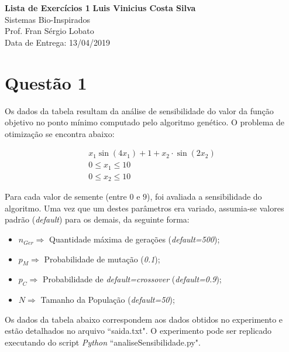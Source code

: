 \documentclass[a4paper, 11pt]{article}
\begin{document}
\noindent
\large\textbf{Lista de Exercícios 1} \hfill \textbf{Luis Vinicius Costa Silva} \\
\normalsize Sistemas Bio-Inspirados \\
Prof. Fran Sérgio Lobato \\
\hfill Data de Entrega: 13/04/2019

\section*{Questão 1}
Os dados da tabela resultam da análise de sensibilidade do valor da função objetivo no ponto mínimo computado pelo algoritmo genético. O problema de otimização se encontra abaixo:

\begin{equation}
\begin{aligned}
x_1 \sin({4x_1}) + 1 + x_2 \cdot \sin({2x_2}) \\ 
0 \leq x_1 \leq 10 \\
0 \leq x_2 \leq 10
\end{aligned}
\end{equation}

Para cada valor de semente (entre $0$ e $9$), foi avaliada a sensibilidade do algoritmo. Uma vez que um destes parâmetros era variado, assumia-se valores padrão (\textit{default}) para os demais, da seguinte forma:

\begin{itemize}
\item $n_{Ger} \Rightarrow$ Quantidade máxima de gerações (\textit{default=500});
\item $p_M \Rightarrow$ Probabilidade de mutação (\textit{0.1});
\item $p_C \Rightarrow$ Probabilidade de \textit{default=crossover} (\textit{default=0.9});
\item $N \Rightarrow$ Tamanho da População (\textit{default=50});
\end{itemize}

Os dados da tabela abaixo correspondem aos dados obtidos no experimento e estão detalhados no arquivo ``saida.txt". O experimento pode ser replicado executando do script \textit{Python} ``analiseSensibilidade.py".\newline
\end{document}
